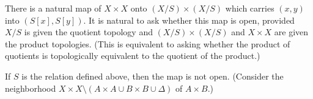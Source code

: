 There is a natural map of $X \times X$ onto $(X/S) \times (X/S)$ which carries $(x, y)$ into $(S[x], S[y])$. It is natural to ask whether this map is open, provided $X/S$ is given the quotient topology and $(X/S) \times (X/S)$ and $X \times X$ are given the product topologies. (This is equivalent to asking whether the product of quotients is topologically equivalent to the quotient of the product.)

If $S$ is the relation defined above, then the map is not open. (Consider the neighborhood $X \times X \setminus (A \times A \cup B \times B \cup \Delta)$ of $A \times B$.)
